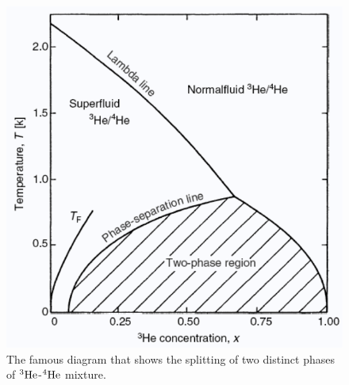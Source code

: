 \begin{figure}
 \centering
 \includegraphics[scale=.45]{img/dilutiondiagram.png}
 \caption{The famous diagram that shows the splitting of two distinct phases of $^3\textrm{He}$-$^4\textrm{He}$ mixture. \cite{dilutiondiagram}}
 \label{fig:dilutiondiagram}
\end{figure}
 
